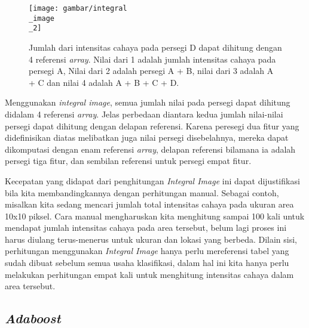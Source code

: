 \begin{figure}[H]
  \centering{}
	\texttt{[image: gambar/integral\\\_image\\\_2]}
  \caption{Jumlah dari intensitas cahaya pada persegi D dapat dihitung dengan 4 referensi \textit{array}. Nilai dari 1 adalah jumlah intensitas cahaya pada persegi A, Nilai dari 2 adalah persegi A + B, nilai dari 3 adalah A + C dan nilai 4 adalah A + B + C + D.}
\end{figure}

Menggunakan \emph{integral image}, semua jumlah nilai pada persegi dapat 
dihitung didalam 4 referensi \emph{array}. Jelas perbedaan 
diantara kedua jumlah nilai-nilai persegi dapat dihitung 
dengan delapan referensi. Karena peresegi dua fitur yang 
didefinisikan diatas melibatkan juga nilai persegi disebelahnya, 
mereka dapat dikomputasi dengan enam referensi \emph{array}, delapan referensi
bilamana ia adalah persegi tiga fitur, dan sembilan referensi untuk 
persegi empat fitur.

Kecepatan yang didapat dari penghitungan \emph{Integral Image} ini dapat dijustifikasi 
bila kita membandingkannya dengan perhitungan manual. Sebagai contoh, misalkan 
kita sedang mencari jumlah total intensitas cahaya pada ukuran area 10x10 
piksel. Cara manual mengharuskan kita menghitung sampai 100 kali untuk mendapat 
jumlah intensitas cahaya pada area tersebut, belum lagi proses ini harus 
diulang terus-menerus untuk ukuran dan lokasi yang berbeda. Dilain sisi, 
perhitungan menggunakan \emph{Integral Image} hanya perlu mereferensi tabel yang 
sudah dibuat sebelum semua usaha klasifikasi, dalam hal ini kita hanya perlu 
melakukan perhitungan empat kali untuk menghitung intensitas cahaya dalam area 
tersebut.

\subsection{\emph{Adaboost}}

